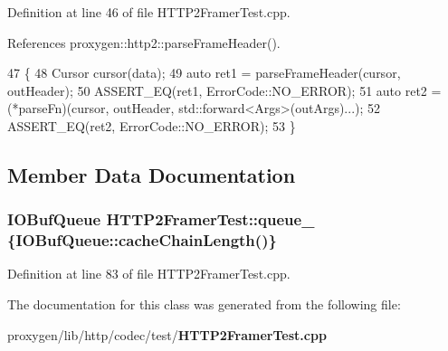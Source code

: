 Definition at line 46 of file H\+T\+T\+P2\+Framer\+Test.\+cpp.



References proxygen\+::http2\+::parse\+Frame\+Header().


\begin{DoxyCode}
47                                                         \{
48     Cursor cursor(data);
49     \textcolor{keyword}{auto} ret1 = parseFrameHeader(cursor, outHeader);
50     ASSERT\_EQ(ret1, ErrorCode::NO\_ERROR);
51     \textcolor{keyword}{auto} ret2 = (*parseFn)(cursor, outHeader, std::forward<Args>(outArgs)...);
52     ASSERT\_EQ(ret2, ErrorCode::NO\_ERROR);
53   \}
\end{DoxyCode}


\subsection{Member Data Documentation}
\subsubsection[{queue\+\_\+}]{\setlength{\rightskip}{0pt plus 5cm}I\+O\+Buf\+Queue H\+T\+T\+P2\+Framer\+Test\+::queue\+\_\+ \{I\+O\+Buf\+Queue\+::cache\+Chain\+Length()\}}\label{classHTTP2FramerTest_ab801fe28561b98fc644fdf910969a944}


Definition at line 83 of file H\+T\+T\+P2\+Framer\+Test.\+cpp.



The documentation for this class was generated from the following file\+:\begin{DoxyCompactItemize}
\item 
proxygen/lib/http/codec/test/{\bf H\+T\+T\+P2\+Framer\+Test.\+cpp}\end{DoxyCompactItemize}

